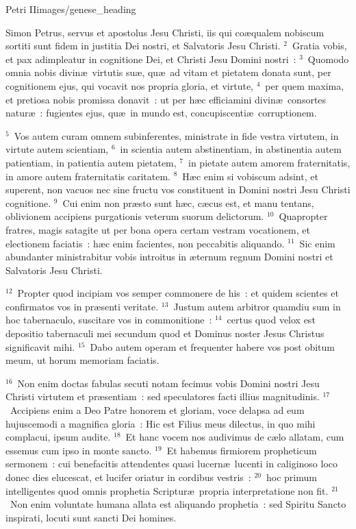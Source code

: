 {Petri II}{images/genese_heading}


\bchapter
\lettrine[lines=6,image=true,loversize=0.05,lraise=-0.03]{S}{}imon Petrus, servus et apostolus Jesu Christi, iis qui co\ae qualem nobiscum sortiti sunt fidem in justitia Dei nostri, et Salvatoris Jesu Christi.
${}^{2}$~Gratia vobis, et pax adimpleatur in cognitione Dei, et Christi Jesu Domini nostri~:
${}^{3}$~Quomodo omnia nobis divin\ae\ virtutis su\ae , qu\ae\ ad vitam et pietatem donata sunt, per cognitionem ejus, qui vocavit nos propria gloria, et virtute,
${}^{4}$~per quem maxima, et pretiosa nobis promissa donavit~: ut per h\ae c efficiamini divin\ae\ consortes natur\ae~: fugientes ejus, qu\ae\ in mundo est, concupiscenti\ae\ corruptionem.


${}^{5}$~Vos autem curam omnem subinferentes, ministrate in fide vestra virtutem, in virtute autem scientiam,
${}^{6}$~in scientia autem abstinentiam, in abstinentia autem patientiam, in patientia autem pietatem,
${}^{7}$~in pietate autem amorem fraternitatis, in amore autem fraternitatis caritatem.
${}^{8}$~H\ae c enim si vobiscum adsint, et superent, non vacuos nec sine fructu vos constituent in Domini nostri Jesu Christi cognitione.
${}^{9}$~Cui enim non pr\ae sto sunt h\ae c, c\ae cus est, et manu tentans, oblivionem accipiens purgationis veterum suorum delictorum.
${}^{10}$~Quapropter fratres, magis satagite ut per bona opera certam vestram vocationem, et electionem faciatis~: h\ae c enim facientes, non peccabitis aliquando.
${}^{11}$~Sic enim abundanter ministrabitur vobis introitus in \ae ternum regnum Domini nostri et Salvatoris Jesu Christi.


${}^{12}$~Propter quod incipiam vos semper commonere de his~: et quidem scientes et confirmatos vos in pr\ae senti veritate.
${}^{13}$~Justum autem arbitror quamdiu sum in hoc tabernaculo, suscitare vos in commonitione~:
${}^{14}$~certus quod velox est depositio tabernaculi mei secundum quod et Dominus noster Jesus Christus significavit mihi.
${}^{15}$~Dabo autem operam et frequenter habere vos post obitum meum, ut horum memoriam faciatis.


${}^{16}$~Non enim doctas fabulas secuti notam fecimus vobis Domini nostri Jesu Christi virtutem et pr\ae sentiam~: sed speculatores facti illius magnitudinis.
${}^{17}$~Accipiens enim a Deo Patre honorem et gloriam, voce delapsa ad eum hujuscemodi a magnifica gloria~: Hic est Filius meus dilectus, in quo mihi complacui, ipsum audite.
${}^{18}$~Et hanc vocem nos audivimus de c\ae lo allatam, cum essemus cum ipso in monte sancto.
${}^{19}$~Et habemus firmiorem propheticum sermonem~: cui benefacitis attendentes quasi lucern\ae\ lucenti in caliginoso loco donec dies elucescat, et lucifer oriatur in cordibus vestris~:
${}^{20}$~hoc primum intelligentes quod omnis prophetia Scriptur\ae\ propria interpretatione non fit.
${}^{21}$~Non enim voluntate humana allata est aliquando prophetia~: sed Spiritu Sancto inspirati, locuti sunt sancti Dei homines.

